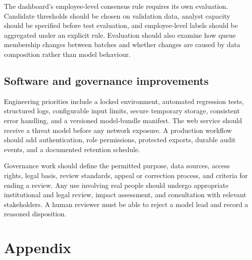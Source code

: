 \documentclass[12pt,a4paper,oneside]{report}
\begin{document}
The dashboard's employee-level consensus rule requires its own
evaluation. Candidate thresholds should be chosen on validation data,
analyst capacity should be specified before test evaluation, and
employee-level labels should be aggregated under an explicit rule.
Evaluation should also examine how queue membership changes between
batches and whether changes are caused by data composition rather
than model behaviour.

\section{Software and governance improvements}
Engineering priorities include a locked environment, automated
regression tests, structured logs, configurable input limits, secure
temporary storage, consistent error handling, and a versioned
model-bundle manifest. The web service should receive a threat model
before any network exposure. A production workflow should add
authentication, role permissions, protected exports, durable audit
events, and a documented retention schedule.

Governance work should define the permitted purpose, data sources,
access rights, legal basis, review standards, appeal or correction
process, and criteria for ending a review. Any use involving real
people should undergo appropriate institutional and legal review,
impact assessment, and consultation with relevant stakeholders. A
human reviewer must be able to reject a model lead and record a
reasoned disposition.

\chapter{Appendix}
\label{chap:appendix}
\end{document}
